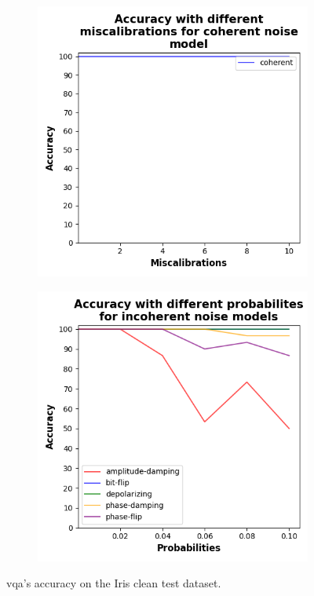 \begin{figure}[!h]
  \centering

  \begin{subfigure}{0.45\textwidth}
      \includegraphics[width=\linewidth]{figures/evaluation_results/iris/pqc/figures/accuracy-coherent.png}
      \label{fig:iris1}
  \end{subfigure} \qquad
  \begin{subfigure}{0.45\textwidth}
      \includegraphics[width=\linewidth]{figures/evaluation_results/iris/pqc/figures/accuracy-incoherent.png}
      \label{fig:iris2}
  \end{subfigure}

  \caption{\ac{vqa}'s accuracy on the Iris clean test dataset.}
\end{figure} \

